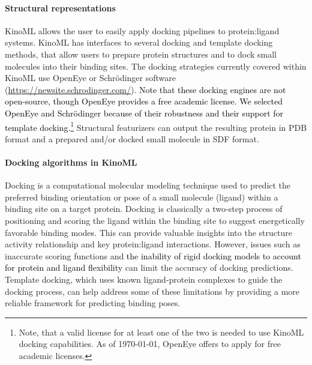 \documentclass[9pt,lessons]{livecoms}
\newcommand{\revision}[1]{\textcolor{black}{#1}}
\begin{document}
\paragraph{\textbf{Structural representations}}
KinoML allows the user to easily apply docking pipelines to protein:ligand systems. KinoML has interfaces to several docking and template docking methods, that allow users to prepare protein structures and to dock small molecules into their binding sites. The docking strategies currently covered within KinoML use OpenEye \cite{oedocking} or Schrödinger software (\url{https://newsite.schrodinger.com/}). \revision{Note that these docking engines are not open-source, though OpenEye provides a free academic license. We selected OpenEye and Schrödinger because of their robustness and their support for template docking.}\footnote{Note, that a valid license for at least one of the two is needed to use KinoML docking capabilities. As of \today, OpenEye offers to apply for free academic licenses.} Structural featurizers can output the resulting protein in PDB format and a prepared and/or docked small molecule in SDF format.

\paragraph{Docking algorithms in KinoML} Docking is a computational molecular modeling technique used to predict the preferred binding orientation or pose of a small molecule (ligand) within a binding site on a target protein. \cite{morris2008molecular} Docking is classically a two-step process of positioning and scoring the ligand within the binding site to suggest energetically favorable binding mode\revision{s}. This can provide valuable insights into the structure activity relationship and key protein:ligand interactions. However, issues such as inaccurate scoring functions and \revision{the inability of rigid docking models to account for protein and ligand flexibility} can limit the accuracy of docking predictions. \cite{forli2016computational} Template docking, which uses known ligand-protein complexes to guide the docking process, can help address some of these limitations by providing a more reliable framework for predicting binding poses. \cite{schaller2023benchmarking}
\end{document}
